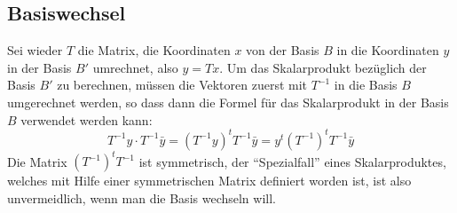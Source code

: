 %
%
\subsection{Basiswechsel}
Sei wieder $T$ die Matrix, die Koordinaten $x$ von der Basis $B$ in die
Koordinaten $y$ in der Basis $B'$ umrechnet, also $y=Tx$.
Um das Skalarprodukt bezüglich der Basis $B'$ zu berechnen,
müssen die Vektoren zuerst mit $T^{-1}$ in die Basis $B$ umgerechnet werden,
so dass dann die Formel für das Skalarprodukt in der Basis $B$
verwendet werden kann:
\[
T^{-1}y\cdot T^{-1}\bar y
=
(T^{-1}y)^tT^{-1}\bar y
=
y^t (T^{-1})^tT^{-1} \bar y
\]
Die Matrix $(T^{-1})^tT^{-1}$ ist symmetrisch, der
``Spezialfall'' eines Skalarproduktes,
welches mit Hilfe einer symmetrischen Matrix definiert worden ist,
ist also unvermeidlich, wenn man die Basis wechseln will.

